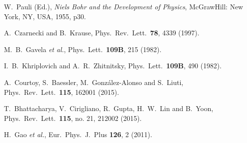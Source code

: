 \documentclass[aps,prd,twocolumn,groupedaddress,showpacs,superscriptaddress,floatfix,nofootinbib,10pt]{revtex4-1}
\begin{document}
\begin{thebibliography}{}
  W.~Pauli (Ed.),
  {\it Niels Bohr and the Development of Physics},
  McGrawHill: New York, NY, USA, 1955, p30.

  A.~Czarnecki and B.~Krause,
  Phys.\ Rev.\ Lett.\  {\bf 78}, 4339 (1997).


  M.~B.~Gavela {\it et al.}, %
  Phys.\ Lett.\  {\bf 109B}, 215 (1982).


  I.~B.~Khriplovich and A.~R.~Zhitnitsky,
  Phys.\ Lett.\  {\bf 109B}, 490 (1982).


  A.~Courtoy, S.~Baessler, M.~Gonz\'alez-Alonso and S.~Liuti,
  Phys.\ Rev.\ Lett.\  {\bf 115}, 162001 (2015).


  T.~Bhattacharya, V.~Cirigliano, R.~Gupta, H.~W.~Lin and B.~Yoon,
  Phys.\ Rev.\ Lett.\  {\bf 115}, no. 21, 212002 (2015).


  H.~Gao {\it et al.},
  Eur.\ Phys.\ J.\ Plus {\bf 126}, 2 (2011).



\end{thebibliography}
\end{document}
